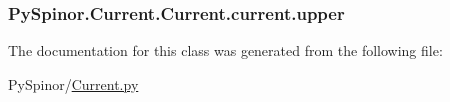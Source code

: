 \subsubsection[{upper}]{\setlength{\rightskip}{0pt plus 5cm}Py\+Spinor.\+Current.\+Current.\+current.\+upper}\label{class_py_spinor_1_1_current_1_1_current_1_1current_a6c01b0e5a656cbd005b1612db36d6abb}


The documentation for this class was generated from the following file\+:\begin{DoxyCompactItemize}
\item 
Py\+Spinor/\hyperlink{_current_8py}{Current.\+py}\end{DoxyCompactItemize}
